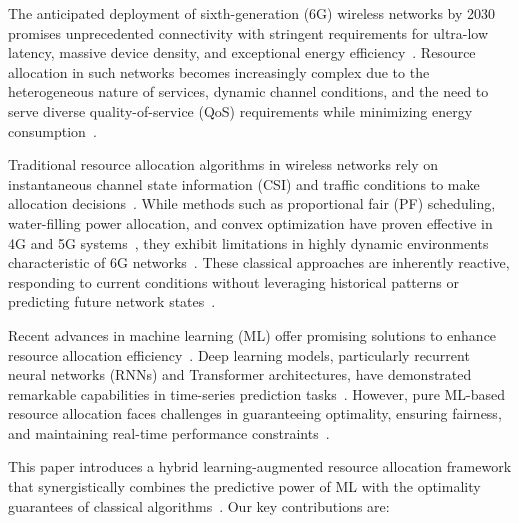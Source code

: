\documentclass[conference]{IEEEtran}
\begin{document}
The anticipated deployment of sixth-generation (6G) wireless networks by 2030 promises unprecedented connectivity with stringent requirements for ultra-low latency, massive device density, and exceptional energy efficiency~\cite{6g_vision,nextg_requirements}. Resource allocation in such networks becomes increasingly complex due to the heterogeneous nature of services, dynamic channel conditions, and the need to serve diverse quality-of-service (QoS) requirements while minimizing energy consumption~\cite{qos_wireless,energy_efficient_6g}.

Traditional resource allocation algorithms in wireless networks rely on instantaneous channel state information (CSI) and traffic conditions to make allocation decisions~\cite{csi_feedback,channel_estimation}. While methods such as proportional fair (PF) scheduling, water-filling power allocation, and convex optimization have proven effective in 4G and 5G systems~\cite{tse_fundamentals,pf_algorithm,waterfilling}, they exhibit limitations in highly dynamic environments characteristic of 6G networks~\cite{nextg_requirements}. These classical approaches are inherently reactive, responding to current conditions without leveraging historical patterns or predicting future network states~\cite{lstm_wireless}.

Recent advances in machine learning (ML) offer promising solutions to enhance resource allocation efficiency~\cite{ml_optimization,hybrid_systems}. Deep learning models, particularly recurrent neural networks (RNNs) and Transformer architectures, have demonstrated remarkable capabilities in time-series prediction tasks~\cite{lstm_wireless,transformer_networks}. However, pure ML-based resource allocation faces challenges in guaranteeing optimality, ensuring fairness, and maintaining real-time performance constraints~\cite{ml_optimization,realtime_systems}.

This paper introduces a hybrid learning-augmented resource allocation framework that synergistically combines the predictive power of ML with the optimality guarantees of classical algorithms~\cite{hybrid_systems}. Our key contributions are:
\end{document}
